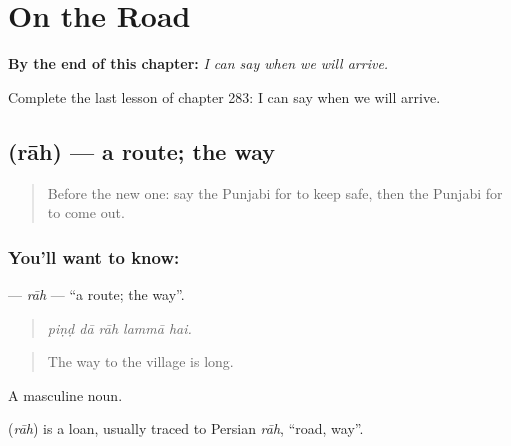
\chapter{On the Road}
\label{ch:pa-a2-on-the-road}

\begin{chapteropening}
\textbf{By the end of this chapter:} \emph{I can say when we will arrive.}

Complete the last lesson of chapter 283: I can say when we will arrive.
\end{chapteropening}

\section[\texorpdfstring{\pa{ਰਾਹ} (rāh)}{ਰਾਹ (rāh)}]{ (rāh) — a route; the way}

\label{lesson:PA-C283-rah}



\begin{quote}
Before the new one: say the Punjabi for to keep safe, then the Punjabi for to come out.
\end{quote}

\subsection*{You'll want to know: }
\textbf{} — \emph{rāh} — \textquotedblleft{}a route; the way\textquotedblright{}.

\begin{quote}
    
\end{quote}

\begin{quote}
\emph{piṇḍ dā rāh lammā hai.}
\end{quote}

\begin{quote}
The way to the village is long.
\end{quote}

A masculine noun.

\begin{cousinweb}
\textbf{} (\emph{rāh}) is a loan, usually traced to Persian \emph{rāh}, \textquotedblleft{}road, way\textquotedblright{}.
\end{cousinweb}

